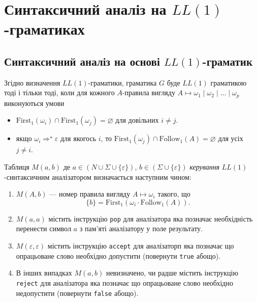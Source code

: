 \setcounter{section}{9}

\section{Синтаксичний аналіз на \texorpdfstring{$LL(1)$}{LL1}-гра\-ма\-ти\-ках}

\subsection{Синтаксичний аналіз на основі \texorpdfstring{$LL(1)$}{LL1}-гра\-ма\-тик}

Згідно визначення $LL(1)$-граматики, граматика $G$ буде $LL(1)$ граматикою тоді і тільки тоді, коли для кожного $A$-правила вигляду $A \mapsto \omega_1 \mid \omega_2 \mid \ldots \mid \omega_p$ виконуються умови
\begin{itemize}
	\item $\text{First}_1 (\omega_i) \cap \text{First}_1 (\omega_j) = \varnothing$ для довільних $i \ne j$.
	\item якщо $\omega_i \Rightarrow^\star \varepsilon$ для якогось $i$, то $\text{First}_1(\omega_j) \cap \text{Follow}_1 (A) = \varnothing$ для усіх $j \ne i$.
\end{itemize}

Таблиця $M(a, b)$ де $a \in (N \cup \Sigma \cup \{\varepsilon\})$, $b \in (\Sigma \cup \{\varepsilon\})$ \textit{керування} $LL(1)$-синтаксичним аналізатором визначається наступним чином:
\begin{enumerate}
	\item $M(A, b)$ --- номер правила вигляду $A \mapsto \omega_i$ такого, що
	\begin{equation}
	    \{b\} = \text{First}_1(\omega_i \cdot \text{Follow}_1 (A)).
	\end{equation}
	\item $M(a, a)$ містить інструкцію \verb|pop| для аналізатора яка позначає необхідність перенести символ $a$ з пам'яті аналізатору у поле результату.
	\item $M(\varepsilon, \varepsilon)$ містить інструкцію \verb|accept| для аналізаторп яка позначає що опрацьоване слово необхідно допустити (повернути \verb|true| абощо).
	\item В інших випадках $M(a, b)$ невизначено, чи радше містить інструкцію \verb|reject| для аналізатора яка позначає що опрацьоване слово необхідно недопустити (повернути \verb|false| абощо).
\end{enumerate}

